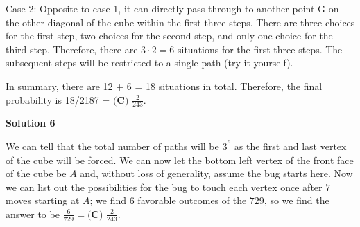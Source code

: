\begin{enumerate}
 Case 2: Opposite to case 1, it can directly pass through to another point G on the other diagonal of the cube within the first three steps. There are three choices for the first step, two choices for the second step, and only one choice for the third step. Therefore, there are $3 \cdot 2 = 6$ situations for the first three steps. The subsequent steps will be restricted to a single path (try it yourself). 

 In summary, there are 12 + 6 = 18 situations in total. Therefore, the final probability is 18/2187 = $\boxed{\textbf{(C) }\frac2{243}}$.

 



\textbf{Solution 6}

We can tell that the total number of paths will be $3^6$ as the first and last vertex of the cube will be forced. We can now let the bottom left vertex of the front face of the cube be $A$ and, without loss of generality, assume the bug starts here. Now we can list out the possibilities for the bug to touch each vertex once after $7$ moves starting at $A$; we find $6$ favorable outcomes of the $729$, so we find the answer to be $\frac{6}{729} = \boxed{\textbf{(C) }\frac{2}{243}}$.

 


\end{enumerate}